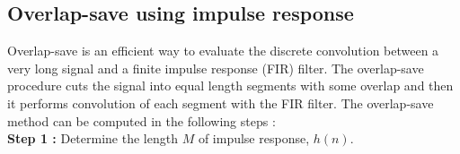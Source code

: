 \begin{refsection}
\subsection*{Overlap-save using impulse response}
Overlap-save is an efficient way to evaluate the discrete convolution between a very long signal and a finite impulse response (FIR) filter. The overlap-save procedure cuts the signal into equal length segments with some overlap and then it performs convolution of each segment with the FIR filter.
The overlap-save method can be computed in the following steps \cite{Smith1999,Blahut1985} :\\
\textbf{ Step 1 :} Determine the length $M$ of impulse response, $h(n)$.\\ \\ 

\end{refsection}
